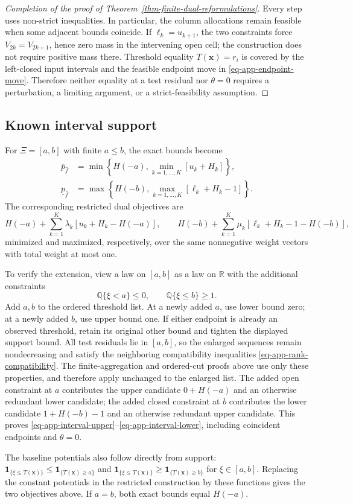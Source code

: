 \begin{proof}[Completion of the proof of Theorem~\ref{thm-finite-dual-reformulations}]
  Every step uses non-strict inequalities. In particular, the column allocations remain feasible when some adjacent bounds coincide. If $\ell_k=u_{k+1}$, the two constraints force $V_{2k}=V_{2k+1}$, hence zero mass in the intervening open cell; the construction does not require positive mass there. Threshold equality $T(\bm x)=r_i$ is covered by the left-closed input intervals and the feasible endpoint move in \eqref{eq-app-endpoint-move}. Therefore neither equality at a test residual nor $\theta=0$ requires a perturbation, a limiting argument, or a strict-feasibility assumption.
\end{proof}

\subsection{Known interval support}
\label{app-interval-support}

For $\Xi=[a,b]$ with finite $a\le b$, the exact bounds become
\begin{align}
  \overline p_{\hat f}
  &=\min\left\{H(-a),\min_{k=1,\ldots,K}\left[u_k+H_k\right]\right\},
  \label{eq-app-interval-upper}\\
  \underline p_{\hat f}
  &=\max\left\{H(-b),\max_{k=1,\ldots,K}\left[\ell_k+H_k-1\right]\right\}.
  \label{eq-app-interval-lower}
\end{align}
The corresponding restricted dual objectives are
\[
  H(-a)+\sum_{k=1}^K\lambda_k\left[u_k+H_k-H(-a)\right],\qquad
  H(-b)+\sum_{k=1}^K\mu_k\left[\ell_k+H_k-1-H(-b)\right],
\]
minimized and maximized, respectively, over the same nonnegative weight vectors with total weight at most one.

To verify the extension, view a law on $[a,b]$ as a law on $\mathbb R$ with the additional constraints
\[
  \mathbb Q\{\xi<a\}\le0,\qquad \mathbb Q\{\xi\le b\}\ge1.
\]
Add $a,b$ to the ordered threshold list. At a newly added $a$, use lower bound zero; at a newly added $b$, use upper bound one. If either endpoint is already an observed threshold, retain its original other bound and tighten the displayed support bound. All test residuals lie in $[a,b]$, so the enlarged sequences remain nondecreasing and satisfy the neighboring compatibility inequalities \eqref{eq-app-rank-compatibility}. The finite-aggregation and ordered-cut proofs above use only these properties, and therefore apply unchanged to the enlarged list. The added open constraint at $a$ contributes the upper candidate $0+H(-a)$ and an otherwise redundant lower candidate; the added closed constraint at $b$ contributes the lower candidate $1+H(-b)-1$ and an otherwise redundant upper candidate. This proves \eqref{eq-app-interval-upper}--\eqref{eq-app-interval-lower}, including coincident endpoints and $\theta=0$.

The baseline potentials also follow directly from support: $\mathbf1_{\{\xi\le T(\bm x)\}}\le\mathbf1_{\{T(\bm x)\ge a\}}$ and $\mathbf1_{\{\xi\le T(\bm x)\}}\ge\mathbf1_{\{T(\bm x)\ge b\}}$ for $\xi\in[a,b]$. Replacing the constant potentials in the restricted construction by these functions gives the two objectives above. If $a=b$, both exact bounds equal $H(-a)$.

